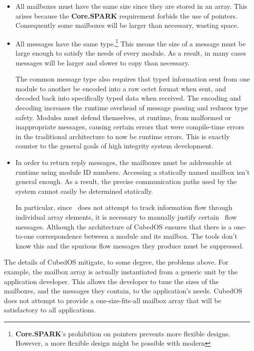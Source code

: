 \begin{itemize}
\item All mailboxes must have the same size since they are stored in an array. This arises
  because the \textbf{Core.SPARK} requirement forbids the use of pointers. Consequently some
  mailboxes will be larger than necessary, wasting space. 

\item All messages have the same type.\footnote{\textbf{Core.SPARK}'s prohibition on pointers
  prevents more flexible designs. However, a more flexible design might be possible with modern
  \SPARK} This means the size of a message must be large enough to satisfy the needs of every
  module. As a result, in many cases messages will be larger and slower to copy than necessary.

  The common message type also requires that typed information sent from one module to another
  be encoded into a raw octet format when sent, and decoded back into specifically typed data
  when received. The encoding and decoding increases the runtime overhead of message passing and
  reduces type safety. Modules must defend themselves, at runtime, from malformed or
  inappropriate messages, causing certain errors that were compile-time errors in the
  traditional architecture to now be runtime errors. This is exactly counter to the general
  goals of high integrity system development.

\item In order to return reply messages, the mailboxes must be addressable at runtime using
  module ID numbers. Accessing a statically named mailbox isn't general enough. As a result, the
  precise communication paths used by the system cannot easily be determined statically.

  In particular, since \SPARK\ does not attempt to track information flow through individual
  array elements, it is necessary to manually justify certain \SPARK\ flow messages.  Although the architecture of CubedOS ensures that there
  is a one-to-one correspondence between a module and its mailbox. The tools don't know this and
  the spurious flow messages they produce must be suppressed.
\end{itemize}

The details of CubedOS mitigate, to some degree, the problems above. For example, the mailbox
array is actually instantiated from a generic unit by the application developer. This allows the
developer to tune the sizes of the mailboxes, and the messages they contain, to the
application's needs. CubedOS does not attempt to provide a one-size-fits-all mailbox array that
will be satisfactory to all applications.

